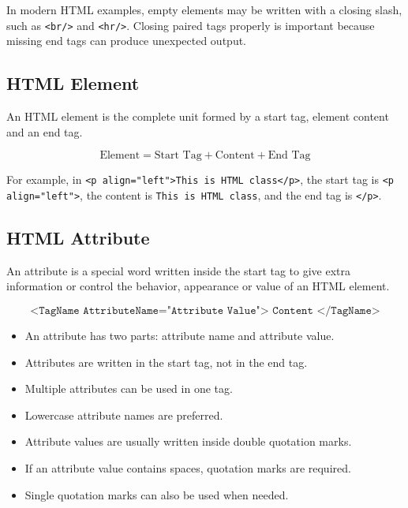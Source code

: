 In modern HTML examples, empty elements may be written with a closing slash, such as \texttt{<br/>} and \texttt{<hr/>}. Closing paired tags properly is important because missing end tags can produce unexpected output.

\subsection{HTML Element}
\begin{definitionbox}
An HTML element is the complete unit formed by a start tag, element content and an end tag.
\end{definitionbox}

\begin{formulabox}
\[
\text{Element} = \text{Start Tag} + \text{Content} + \text{End Tag}
\]
\end{formulabox}

For example, in \texttt{<p align="left">This is HTML class</p>}, the start tag is \texttt{<p align="left">}, the content is \texttt{This is HTML class}, and the end tag is \texttt{</p>}.

\subsection{HTML Attribute}
\begin{definitionbox}[Attribute]
An attribute is a special word written inside the start tag to give extra information or control the behavior, appearance or value of an HTML element.
\end{definitionbox}

\begin{formulabox}
\[
\texttt{<TagName AttributeName="Attribute Value"> Content </TagName>}
\]
\end{formulabox}

\begin{itemize}
    \item An attribute has two parts: attribute name and attribute value.
    \item Attributes are written in the start tag, not in the end tag.
    \item Multiple attributes can be used in one tag.
    \item Lowercase attribute names are preferred.
    \item Attribute values are usually written inside double quotation marks.
    \item If an attribute value contains spaces, quotation marks are required.
    \item Single quotation marks can also be used when needed.
\end{itemize}

